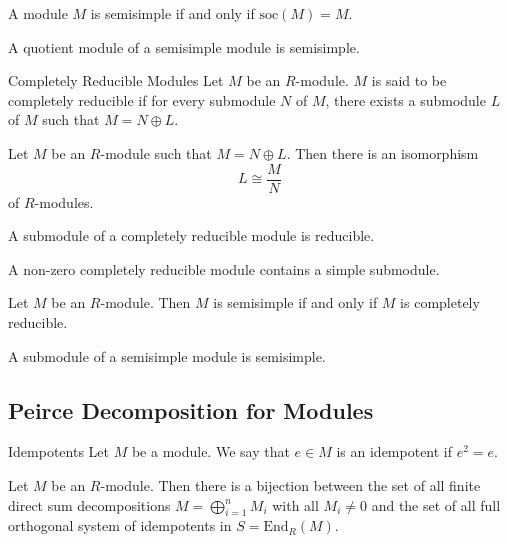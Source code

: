 \documentclass[a4paper]{article}
\begin{document}
\begin{lmm}{}{} A module $M$ is semisimple if and only if $\text{soc}(M)=M$. 
\end{lmm}

\begin{crl}{}{} A quotient module of a semisimple module is semisimple. 
\end{crl}

\begin{defn}{Completely Reducible Modules}{} Let $M$ be an $R$-module. $M$ is said to be completely reducible if for every submodule $N$ of $M$, there exists a submodule $L$ of $M$ such that $M=N\oplus L$. 
\end{defn}

\begin{prp}{}{} Let $M$ be an $R$-module such that $M=N\oplus L$. Then there is an isomorphism $$L\cong\frac{M}{N}$$ of $R$-modules. 
\end{prp}

\begin{lmm}{}{} A submodule of a completely reducible module is reducible. 
\end{lmm}

\begin{lmm}{}{} A non-zero completely reducible module contains a simple submodule. 
\end{lmm}

\begin{thm}{}{} Let $M$ be an $R$-module. Then $M$ is semisimple if and only if $M$ is completely reducible. 
\end{thm}

\begin{crl}{}{} A submodule of a semisimple module is semisimple. 
\end{crl}

\subsection{Peirce Decomposition for Modules}
\begin{defn}{Idempotents}{} Let $M$ be a module. We say that $e\in M$ is an idempotent if $e^2=e$. 
\end{defn}

\begin{prp}{}{} Let $M$ be an $R$-module. Then there is a bijection between the set of all finite direct sum decompositions $M=\bigoplus_{i=1}^n M_i$ with all $M_i\neq 0$ and the set of all full orthogonal system of idempotents in $S=\text{End}_R(M)$. 
\end{prp}
\end{document}
